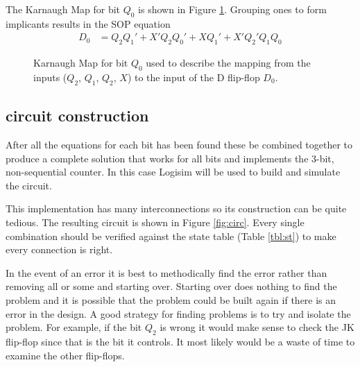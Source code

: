 \documentclass[12pt]{article}
\begin{document}
The Karnaugh Map for bit $Q_0$ is shown in Figure \ref{fig:kmapQ0}.
Grouping ones to form implicants results in the SOP equation
\begin{align*}
D_0 &= Q_2 Q_1' + X' Q_2 Q_0' + X Q_1' + X' Q_2' Q_1 Q_0
\end{align*}

\begin{figure}
\center
{}
\caption{Karnaugh Map for bit $Q_0$ used to describe the mapping from
the inputs ($Q_2$, $Q_1$, $Q_2$, $X$) to the input of the D flip-flop $D_0$.}
\label{fig:kmapQ0}
\end{figure}

\subsection{circuit construction}

After all the equations for each bit has been found these
be combined together to produce a complete solution that works
for all bits and implements the 3-bit, non-sequential counter.
In this case Logisim\cite{LOGISIM} will be used to build and simulate the circuit.

This implementation has many interconnections so its construction
can be quite tedious.
The resulting circuit is shown in Figure \ref{fig:circ}.
Every single combination should be verified against the
state table (Table \ref{tbl:st}) to make every connection is right.

In the event of an error it is best to methodically find the error rather
than removing all or some and starting over.
Starting over does nothing to find the problem and it is possible that
the problem could be built again if there is an error in the design.
A good strategy for finding problems is to try and isolate the problem.
For example, if the bit $Q_2$ is wrong it would make sense to check
the JK flip-flop since that is the bit it controls.
It most likely would be a waste of time to examine the other flip-flops.
\end{document}
